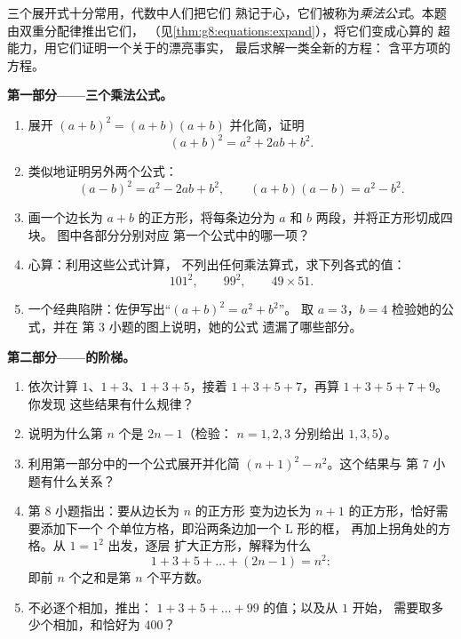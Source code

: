 \begin{problem}[{周末问题——$(a+b)^2$，$(a-b)^2$，
$(a+b)(a-b)$，以及奇数求和 $1 + 3 + 5 + \dots + (2n-1) = n^2$}]
\label{pb:g8:equations:1}
三个展开式十分常用，代数中人们把它们
熟记于心，它们被称为\emph{乘法公式}。本题
由双重分配律推出它们，
（见\cref{thm:g8:equations:expand}），将它们变成心算的
超能力，用它们证明一个关于的漂亮事实，
最后求解一类全新的方程：
含平方项的方程。

\medskip
\noindent\textbf{第一部分——三个乘法公式。}
\begin{enumerate}
  \item 展开 $(a + b)^2 = (a + b)(a + b)$ 并化简，证明
        \[
        (a + b)^2 = a^2 + 2ab + b^2 .
        \]
  \item 类似地证明另外两个公式：
        \[
        (a - b)^2 = a^2 - 2ab + b^2,
        \qquad
        (a + b)(a - b) = a^2 - b^2 .
        \]
  \item 画一个边长为 $a + b$ 的正方形，将每条边分为 $a$
        和 $b$ 两段，并将正方形切成四块。
        图中各部分分别对应
        第一个公式中的哪一项？
  \item 心算：利用这些公式计算，
        不列出任何乘法算式，求下列各式的值：
        \[
        101^2, \qquad 99^2, \qquad 49 \times 51 .
        \]
  \item 一个经典陷阱：佐伊写出“$(a + b)^2 = a^2 + b^2$”。
        取 $a = 3$，$b = 4$ 检验她的公式，并在
        第 3 小题的图上说明，她的公式
        遗漏了哪些部分。
\end{enumerate}

\medskip
\noindent\textbf{第二部分——的阶梯。}
\begin{enumerate}[resume]
  \item 依次计算 $1$、$1 + 3$、$1 + 3 + 5$，接着
        $1 + 3 + 5 + 7$，再算 $1 + 3 + 5 + 7 + 9$。你发现
        这些结果有什么规律？
  \item 说明为什么第 $n$ 个是 $2n - 1$（检验：
        $n = 1, 2, 3$ 分别给出 $1, 3, 5$）。
  \item 利用第一部分中的一个公式展开并化简
        $(n + 1)^2 - n^2$。这个结果与
        第 7 小题有什么关系？
  \item 第 8 小题指出：要从边长为 $n$ 的正方形
        变为边长为 $n + 1$ 的正方形，恰好需要添加下一个
        个单位方格，即沿两条边加一个 L 形的框，
        再加上拐角处的方格。从 $1 = 1^2$ 出发，逐层
        扩大正方形，解释为什么
        \[
        1 + 3 + 5 + \dots + (2n - 1) = n^2 :
        \]
        即前 $n$ 个之和是第 $n$ 个平方数。
  \item 不必逐个相加，推出：
        $1 + 3 + 5 + \dots + 99$ 的值；以及从 $1$ 开始，
        需要取多少个相加，和恰好为 $400$？
\end{enumerate}


\end{problem}
